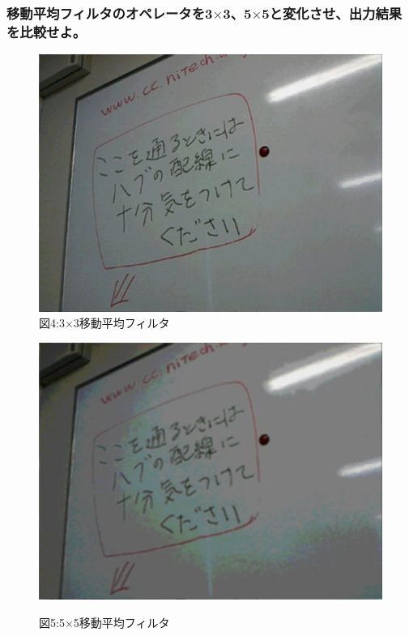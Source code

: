 ﻿\documentclass[a4j,11pt]{jarticle}
\begin{document}
\subsubsection{移動平均フィルタのオペレータを3$\times$3、5$\times$5と変化させ、出力結果を比較せよ。}
\clearpage
\clearpage
\begin{figure}[tb]


 \begin{minipage}{0.49\hsize} %
   \center
   \includegraphics[width=\hsize]{./eps/smooth-movingAverage-dim3.eps}
   図4:3$\times$3移動平均フィルタ
 \end{minipage}
 \begin{minipage}{0.49\hsize} %
   \center
   \includegraphics[width=\hsize]{./eps/smooth-movingAverage-dim5.eps}

   図5:5$\times$5移動平均フィルタ
 \end{minipage}
 \label{fig:affine2}
\end{figure}
\end{document}
